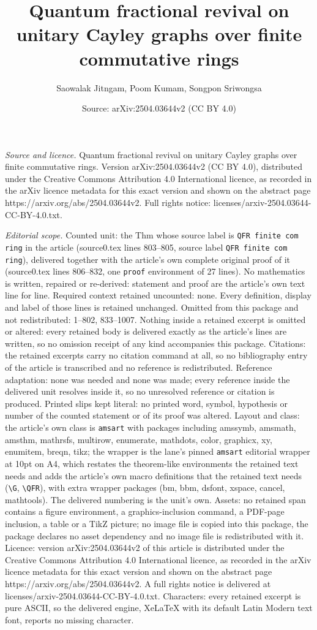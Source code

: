 \documentclass[10pt,a4paper]{amsart}
\title[Quantum fractional revival on unitary Cayley graphs over fin]{Quantum fractional revival on unitary Cayley graphs over finite commutative rings}
\author{Saowalak Jitngam, Poom Kumam, Songpon Sriwongsa}
\date{Source: arXiv:2504.03644v2 (CC BY 4.0)}
\begin{document}
\maketitle

\noindent\emph{Source and licence.} Quantum fractional revival on unitary Cayley graphs over finite commutative rings. Version arXiv:2504.03644v2 (CC BY 4.0), distributed under the Creative Commons Attribution 4.0 International licence, as recorded in the arXiv licence metadata for this exact version and shown on the abstract page https://arxiv.org/abs/2504.03644v2. Full rights notice: licenses/arxiv-2504.03644-CC-BY-4.0.txt.\par\smallskip

\noindent\textit{Editorial scope.} Counted unit: the Thm whose source label is \texttt{QFR finite com ring} in the article (source0.tex lines 803--805, source label \texttt{QFR finite com ring}), delivered together with the article's own complete original proof of it (source0.tex lines 806--832, one \texttt{proof} environment of 27 lines). No mathematics is written, repaired or re-derived: statement and proof are the article's own text line for line. Required context retained uncounted: none. Every definition, display and label of those lines is retained unchanged. Omitted from this package and not redistributed: 1--802, 833--1007. Nothing inside a retained excerpt is omitted or altered: every retained body is delivered exactly as the article's lines are written, so no omission receipt of any kind accompanies this package. Citations: the retained excerpts carry no citation command at all, so no bibliography entry of the article is transcribed and no reference is redistributed. Reference adaptation: none was needed and none was made; every reference inside the delivered unit resolves inside it, so no unresolved reference or citation is produced. Printed slips kept literal: no printed word, symbol, hypothesis or number of the counted statement or of its proof was altered. Layout and class: the article's own class is \texttt{amsart} with packages including amssymb, amsmath, amsthm, mathrsfs, multirow, enumerate, mathdots, color, graphicx, xy, enumitem, breqn, tikz; the wrapper is the lane's pinned \texttt{amsart} editorial wrapper at 10pt on A4, which restates the theorem-like environments the retained text needs and adds the article's own macro definitions that the retained text needs (\texttt{\textbackslash G}, \texttt{\textbackslash QFR}), with extra wrapper packages (bm, bbm, dsfont, xspace, cancel, mathtools). The delivered numbering is the unit's own. Assets: no retained span contains a figure environment, a graphics-inclusion command, a PDF-page inclusion, a table or a TikZ picture; no image file is copied into this package, the package declares no asset dependency and no image file is redistributed with it. Licence: version arXiv:2504.03644v2 of this article is distributed under the Creative Commons Attribution 4.0 International licence, as recorded in the arXiv licence metadata for this exact version and shown on the abstract page https://arxiv.org/abs/2504.03644v2. A full rights notice is delivered at licenses/arxiv-2504.03644-CC-BY-4.0.txt. Characters: every retained excerpt is pure ASCII, so the delivered engine, XeLaTeX with its default Latin Modern text font, reports no missing character.
\end{document}
